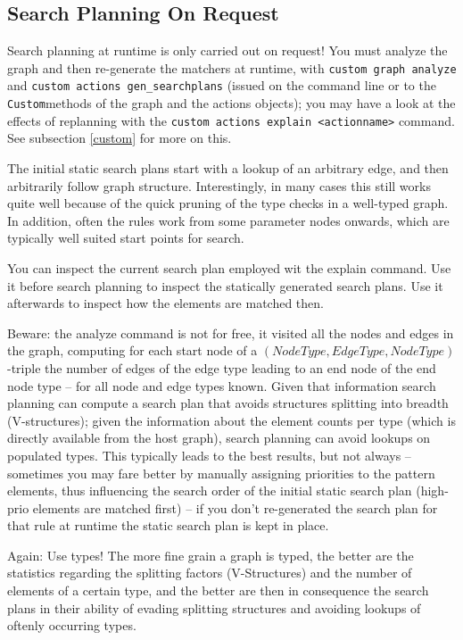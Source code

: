\subsection{Search Planning On Request}
Search planning at runtime is only carried out on request!
You must analyze the graph and then re-generate the matchers at runtime,
with \texttt{custom graph analyze} and \texttt{custom actions gen\_searchplans} (issued on the command line or to the \texttt{Custom}methods of the graph and the actions objects);
you may have a look at the effects of replanning with the \texttt{custom actions explain <actionname>} command.
See subsection \ref{custom} for more on this.

The initial static search plans start with a lookup of an arbitrary edge, and then arbitrarily follow graph structure.
Interestingly, in many cases this still works quite well because of the quick pruning of the type checks in a well-typed graph.
In addition, often the rules work from some parameter nodes onwards, which are typically well suited start points for search.

You can inspect the current search plan employed wit the explain command.
Use it before search planning to inspect the statically generated search plans.
Use it afterwards to inspect how the elements are matched then.

Beware: the analyze command is not for free, it visited all the nodes and edges in the graph, computing for each start node of a $(NodeType, EdgeType, NodeType)$-triple the number of edges of the edge type leading to an end node of the end node type -- for all node and edge types known.
Given that information search planning can compute a search plan that avoids structures splitting into breadth (V-structures);
given the information about the element counts per type (which is directly available from the host graph), 
search planning can avoid lookups on populated types.
This typically leads to the best results, but not always -- sometimes you may fare better by manually assigning priorities to the pattern elements, thus influencing the search order of the initial static search plan (high-prio elements are matched first) -- if you don't re-generated the search plan for that rule at runtime the static search plan is kept in place.

Again: Use types!
The more fine grain a graph is typed, the better are the statistics regarding the splitting factors (V-Structures) and the number of elements of a certain type, and the better are then in consequence the search plans in their ability of evading splitting structures and avoiding lookups of oftenly occurring types.

